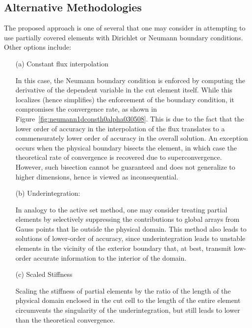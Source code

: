 \documentclass[12pt,twoside]{article}
\begin{document}
\subsection{Alternative Methodologies}\label{sec:attempted}
\par
The proposed approach is one of several that one may consider in
attempting to use partially covered elements with Dirichlet 
or Neumann boundary conditions. Other options include: 
%
\begin{itemize}
\item[(a)] Constant flux interpolation

In this case, the Neumann boundary condition is enforced by
computing the derivative of the dependent variable in the cut element
itself. While this localizes (hence simplifies) the enforcement of the boundary
condition, it compromises the convergence rate, as shown in
Figure~\ref{fig:neumann1dconsth0alpha030508}. This is due to the
fact that the lower order of accuracy in the interpolation of the flux
translates to a commensurately lower order of accuracy in the overall
solution. An exception occurs when the physical boundary bisects the 
element, in which case the theoretical rate of convergence is recovered 
due to superconvergence. However, such bisection cannot be guaranteed
and does not generalize to higher dimensions, hence is viewed as
inconsequential. 
%
\item[(b)] Underintegration: 

In analogy to the active set method, one may consider treating partial
elements by selectively suppressing the contributions to global arrays 
from Gauss points that lie outside the physical domain. This method also leads 
to solutions of lower-order of accuracy, since underintegration leads
to unstable elements in the vicinity of the exterior boundary that, at
best, transmit low-order accurate information to the interior of the
domain. 
%
\item[(c)] Scaled Stiffness

Scaling the stiffness of partial elements by the ratio of the length of the 
physical domain enclosed in the cut cell to the length of the entire element
circumvents the singularity of the underintegration, but still leads
to lower than the theoretical convergence. 
\end{itemize}

\newpage
\end{document}
